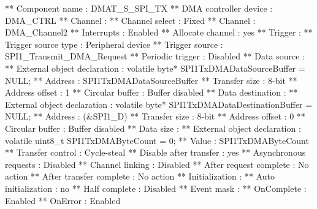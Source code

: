 \begin{DoxyCode}
**          Component name                                 : DMAT\_S\_SPI\_TX
**          DMA controller device                          : DMA\_CTRL
**          Channel                                        : 
**            Channel select                               : Fixed
**              Channel                                    : DMA\_Channel2
**              Interrupts                                 : Enabled
**              Allocate channel                           : yes
**          Trigger                                        : 
**            Trigger source type                          : Peripheral device
**              Trigger source                             : SPI1\_Transmit\_DMA\_Request
**              Periodic trigger                           : Disabled
**          Data source                                    : 
**            External \textcolor{keywordtype}{object} declaration                  : \textcolor{keyword}{volatile} byte* SPI1TxDMADataSourceBuffer = 
      NULL;
**            Address                                      : SPI1TxDMADataSourceBuffer
**            Transfer size                                : 8-bit
**            Address offset                               : 1
**            Circular buffer                              : Buffer disabled
**          Data destination                               : 
**            External \textcolor{keywordtype}{object} declaration                  : \textcolor{keyword}{volatile} byte* SPI1TxDMADataDestinationBuffer 
      = NULL;
**            Address                                      : (&SPI1\_D)
**            Transfer size                                : 8-bit
**            Address offset                               : 0
**            Circular buffer                              : Buffer disabled
**          Data size                                      : 
**            External \textcolor{keywordtype}{object} declaration                  : \textcolor{keyword}{volatile} uint8\_t SPI1TxDMAByteCount = 0;
**            Value                                        : SPI1TxDMAByteCount
**          Transfer control                               : Cycle-steal
**            Disable after transfer                       : yes
**            Asynchronous requests                        : Disabled
**            Channel linking                              : Disabled
**            After request complete                       : No action
**            After transfer complete                      : No action
**          Initialization                                 : 
**            Auto initialization                          : no
**            Half complete                                : Disabled
**            Event mask                                   : 
**              OnComplete                                 : Enabled
**              OnError                                    : Enabled
\end{DoxyCode}
